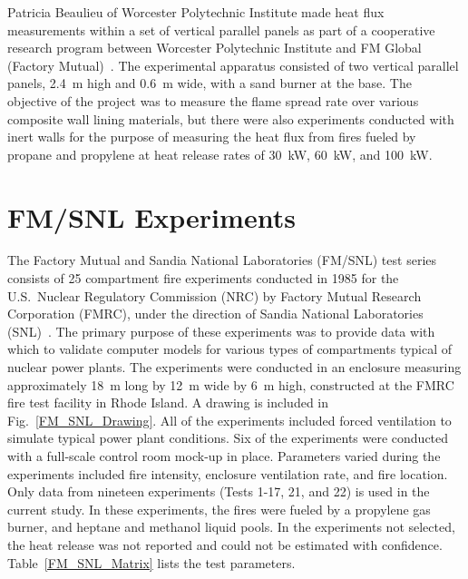 Patricia Beaulieu of Worcester Polytechnic Institute made heat flux measurements within a set of vertical parallel panels as part of a cooperative research program between Worcester Polytechnic Institute and FM Global (Factory Mutual)~\cite{Beaulieu:FM}. The experimental apparatus consisted of two vertical parallel panels, 2.4~m high and 0.6~m wide, with a sand burner at the base. The objective of the project was to measure the flame spread rate over various composite wall lining materials, but there were also experiments conducted with inert walls for the purpose of measuring the heat flux from fires fueled by propane and propylene at heat release rates of 30~kW, 60~kW, and 100~kW.



\section{FM/SNL Experiments}


The Factory Mutual and Sandia National Laboratories (FM/SNL) test series consists of 25 compartment fire experiments conducted in 1985 for the U.S.~Nuclear Regulatory Commission (NRC) by Factory Mutual Research Corporation (FMRC), under the direction of Sandia National Laboratories (SNL)~\cite{Nowlen:NUREG4681,Nowlen:NUREG4527}. The primary purpose of these experiments was to provide data with which to validate computer models for various types of compartments typical of nuclear power plants. The experiments were conducted in an enclosure measuring approximately 18~m long by 12~m wide by 6~m high, constructed at the FMRC fire test facility in Rhode Island. A drawing is included in Fig.~\ref{FM_SNL_Drawing}. All of the experiments included forced ventilation to simulate typical power plant conditions. Six of the experiments were conducted with a full-scale control room mock-up in place. Parameters varied during the experiments included fire intensity, enclosure ventilation rate, and fire location. Only data from nineteen experiments (Tests 1-17, 21, and 22) is used in the current study. In these experiments, the fires were fueled by a propylene gas burner, and heptane and methanol liquid pools. In the experiments not selected, the heat release was not reported and could not be estimated with confidence. Table~\ref{FM_SNL_Matrix} lists the test parameters.


